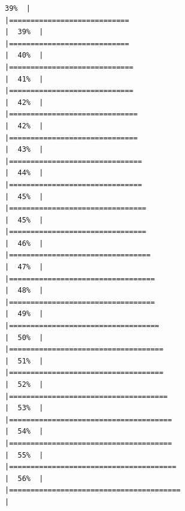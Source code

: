 \documentclass[
]{article}
\begin{document}
\begin{verbatim}
39%  |                                                                              |============================                                          |  39%  |                                                                              |============================                                          |  40%  |                                                                              |=============================                                         |  41%  |                                                                              |=============================                                         |  42%  |                                                                              |==============================                                        |  42%  |                                                                              |==============================                                        |  43%  |                                                                              |===============================                                       |  44%  |                                                                              |===============================                                       |  45%  |                                                                              |================================                                      |  45%  |                                                                              |================================                                      |  46%  |                                                                              |=================================                                     |  47%  |                                                                              |==================================                                    |  48%  |                                                                              |==================================                                    |  49%  |                                                                              |===================================                                   |  50%  |                                                                              |====================================                                  |  51%  |                                                                              |====================================                                  |  52%  |                                                                              |=====================================                                 |  53%  |                                                                              |======================================                                |  54%  |                                                                              |======================================                                |  55%  |                                                                              |=======================================                               |  56%  |                                                                              |========================================                              |  
\end{verbatim}
\end{document}
